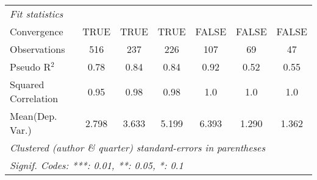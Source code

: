 \begin{tabular}{lcccccc}
   \emph{Fit statistics}\\
   Convergence                                                &TRUE          & TRUE    & TRUE         & FALSE   & FALSE          & FALSE\\  
   Observations                                               & 516          & 237     & 226          & 107     & 69             & 47\\  
   Pseudo R$^2$                                               & 0.78         & 0.84    & 0.84         & 0.92    & 0.52           & 0.55\\  
   Squared Correlation                                        & 0.95         & 0.98    & 0.98         & 1.0     & 1.0            & 1.0\\  
Mean(Dep. Var.) & 2.798 & 3.633 & 5.199 & 6.393 & 1.290 & 1.362 \\
   \midrule \midrule
   \multicolumn{7}{l}{\emph{Clustered (author \& quarter) standard-errors in parentheses}}\\
   \multicolumn{7}{l}{\emph{Signif. Codes: ***: 0.01, **: 0.05, *: 0.1}}\\
\end{tabular}
\par\endgroup
